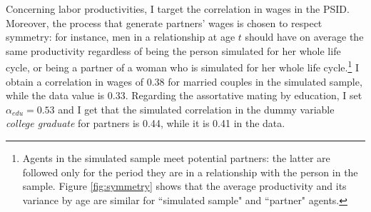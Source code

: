 \documentclass[12pt]{article}
\begin{document}
\begin{table}[h!]
 \end{table}
  Concerning labor productivities, I target the correlation in wages in the PSID. Moreover, the process that generate partners' wages is chosen to respect symmetry: for instance, men in a relationship at age $t$ should have on average the same productivity regardless of being the person simulated for her whole life cycle, or being a partner of a woman who is simulated for her whole life cycle.\footnote{Agents in the simulated sample meet potential partners: the latter are followed only for the period they are in a relationship with the person in the sample. Figure \ref{fig:symmetry} shows that the average productivity and its variance by age are similar for ``simulated sample" and ``partner" agents.} I obtain a correlation in wages of 0.38 for married couples in the simulated sample, while the data value is 0.33. Regarding the assortative mating by education, I set $\alpha_{edu}=0.53$ and I get that the simulated correlation in the dummy variable \textit{college graduate} for partners is 0.44, while it is 0.41 in the data.
\end{document}

